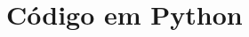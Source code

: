 \documentclass[11pt,a4paper]{article}
\begin{document}
\appendix
\section{Código em Python}
\label{ap:codigo}


\end{document}
